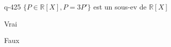\begin{truefalse}{q-425}
$\{ P \in \mathbb R[X], P=3P'\}$ est un sous-ev de $\mathbb R[X]$
\item* Vrai
\item Faux
\end{truefalse}

